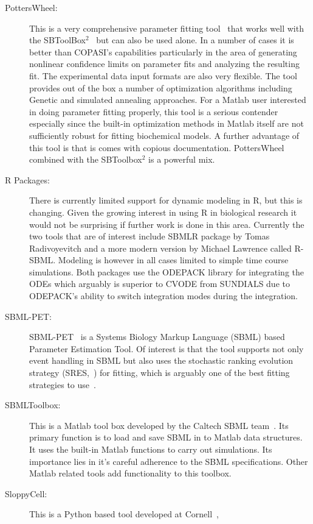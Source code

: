 \documentclass[12pt]{article}
\begin{document}
\begin{description}
\item[PottersWheel:] This is a very comprehensive parameter
fitting tool~\citep{PottersWheel:2008} that works well with the
SBToolBox$^2$~\citep{Henning:2006} but can also be used alone. In a
number of cases it is better than COPASI's capabilities particularly
in the area of generating nonlinear confidence limits on parameter
fits and analyzing the resulting fit. The experimental data input
formats are also very flexible. The tool provides out of the box a
number of optimization algorithms including Genetic and simulated
annealing approaches. For a Matlab user interested in doing
parameter fitting properly, this tool is a serious contender
especially since the built-in optimization methods in Matlab itself
are not sufficiently robust for fitting biochemical models. A
further advantage of this tool is that is comes with copious
documentation. PottersWheel combined with the SBToolbox$^2$ is a
powerful mix.
%
\item[R Packages:] There is currently limited support for dynamic modeling in R, but this is changing. Given
the growing interest in using R in biological research it would not
be surprising if further work is done in this area. Currently the
two tools that are of interest include SBMLR package by Tomas
Radivoyevitch and a more modern version by Michael Lawrence called
R-SBML. Modeling is however in all cases limited to simple time
course simulations. Both packages use the ODEPACK library for
integrating the ODEs which arguably is superior to CVODE from
SUNDIALS due to ODEPACK's ability to switch integration modes during
the integration.
%
\item[SBML-PET:] SBML-PET~\citep{Zi:2006} is a Systems Biology Markup
Language (SBML) based Parameter Estimation Tool. Of interest is that
the tool supports not only event handling in SBML but also uses the
stochastic ranking evolution strategy (SRES,~\citet{SRES:2007}) for
fitting, which is arguably one of the best fitting strategies to
use~\citep{Moles:2003}.
%
\item[SBMLToolbox:] This is a Matlab tool box developed by the Caltech SBML
team~\citep{Keating:2006}. Its primary function is to load and save
SBML in to Matlab data structures. It uses the built-in Matlab
functions to carry out simulations. Its importance lies in it's
careful adherence to the SBML specifications. Other Matlab related tools add functionality to this toolbox.
%
\item[SloppyCell:] This is a Python based tool developed at Cornell~\citep{SloppyCell:2007},

\end{description}
\end{document}
